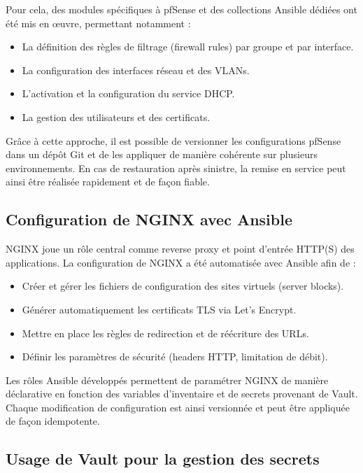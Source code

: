 Pour cela, des modules spécifiques à pfSense et des collections Ansible dédiées ont été mis en œuvre, permettant notamment :
\begin{itemize}
	\item La définition des règles de filtrage (firewall rules) par groupe et par interface.
	\item La configuration des interfaces réseau et des VLANs.
	\item L’activation et la configuration du service DHCP.
	\item La gestion des utilisateurs et des certificats.
\end{itemize}

Grâce à cette approche, il est possible de versionner les configurations pfSense dans un dépôt Git et de les appliquer de manière cohérente sur plusieurs environnements.
En cas de restauration après sinistre, la remise en service peut ainsi être réalisée rapidement et de façon fiable.

\subsection{Configuration de NGINX avec Ansible}

NGINX joue un rôle central comme reverse proxy et point d’entrée HTTP(S) des applications.
La configuration de NGINX a été automatisée avec Ansible afin de :
\begin{itemize}
	\item Créer et gérer les fichiers de configuration des sites virtuels (server blocks).
	\item Générer automatiquement les certificats TLS via Let’s Encrypt.
	\item Mettre en place les règles de redirection et de réécriture des URLs.
	\item Définir les paramètres de sécurité (headers HTTP, limitation de débit).
\end{itemize}

Les rôles Ansible développés permettent de paramétrer NGINX de manière déclarative en fonction des variables d’inventaire et de secrets provenant de Vault.
Chaque modification de configuration est ainsi versionnée et peut être appliquée de façon idempotente.

\subsection{Usage de Vault pour la gestion des secrets}

